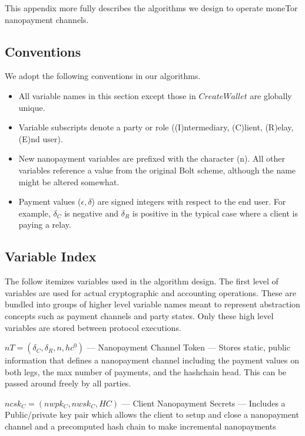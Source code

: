 \label{chap:algorithms}

This appendix more fully describes the algorithms we design to operate moneTor nanopayment
channels.

\subsection{Conventions}

We adopt the following conventions in our algorithms.

\begin{itemize}
\item All variable names in this section except those in $Create Wallet$ are
  globally unique.
\item Variable subscripts denote a party or role ((I)ntermediary,
  (C)lient, (R)elay, (E)nd user).
\item New nanopayment variables are prefixed with the character
  (n). All other variables reference a value from the original Bolt
  scheme, although the name might be altered somewhat.
\item Payment values ($\epsilon, \delta$) are signed integers with
  respect to the end user. For example, $\delta_C$ is negative and
  $\delta_R$ is positive in the typical case where a client is paying
  a relay.
\end{itemize}

\subsection{Variable Index}

The follow itemizes variables used in the algorithm design. The first level of
variables are used for actual cryptographic and accounting operations. These are
bundled into groups of higher level variable names meant to represent
abstraction concepts such as payment channels and party states. Only these high
level variables are stored between protocol executions.

$nT = (\delta_C, \delta_R, n, hc^0)$ --- Nanopayment Channel Token ---
Stores static, public information that defines a nanopayment channel including
the payment values on both legs, the max number of payments, and the hashchain
head. This can be passed around freely by all parties.

$ncsk_C = (nwpk_C, nwsk_C, HC)$ --- Client Nanopayment Secrets --- Includes
a Public/private key pair which allows the client to setup and close a
nanopayment channel and a precomputed hash chain to make incremental
nanopayments

